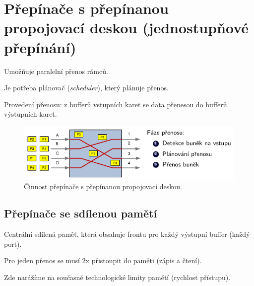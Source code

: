 
\section{Přepínače s přepínanou propojovací deskou (jednostupňové přepínání)}

\begin{compactitem}
    \item Umožňuje paralelní přenos rámců.
    \item Je potřeba plánovač (\textit{scheduler}), který plánuje přenos.
    \item Provedení přenosu: z bufferů vstupních karet se data přenesou do bufferů výstupních karet.
\end{compactitem}

\begin{figure}[H]
    \centering
    \includegraphics[width=1\linewidth]{prepinana_propojovaci_deska.pdf}
    \caption{Činnost přepínače s přepínanou propojovací deskou.}
\end{figure}

\subsection{Přepínače se sdílenou pamětí}

\begin{compactitem}
    \item Centrální sdílená paměť, která obsahuje frontu pro každý výstupní buffer (každý port).
    \item Pro jeden přenos se musí 2x přistoupit do paměti (zápis a čtení).
    \item Zde narážíme na současné technologické limity pamětí (rychlost přístupu).
\end{compactitem}

